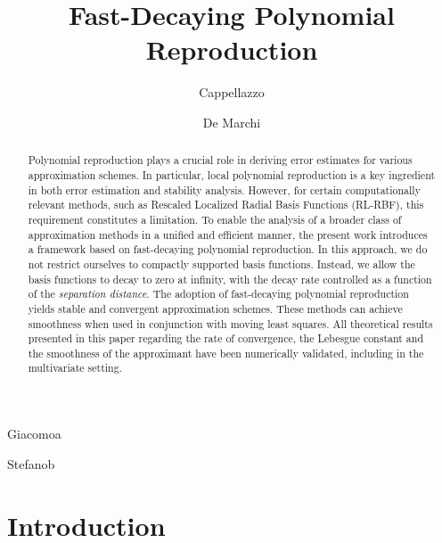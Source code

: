 \documentclass{drna}
\begin{document}
\title{Fast-Decaying Polynomial Reproduction}

\author{Cappellazzo}{Giacomo}{a}
\author{De Marchi}{Stefano}{b}




\maketitle


\begin{abstract}
Polynomial reproduction plays a crucial role in deriving error estimates for various approximation schemes. In particular, local polynomial reproduction is a key ingredient in both error estimation and stability analysis. However, for certain computationally relevant methods, such as Rescaled Localized Radial Basis Functions (RL-RBF), this requirement constitutes a limitation.
To enable the analysis of a broader class of approximation methods in a unified and efficient manner, the present work introduces a framework based on fast-decaying polynomial reproduction. In this approach, we do not restrict ourselves to compactly supported basis functions. Instead, we allow the basis functions to decay to zero at infinity, with the decay rate controlled as a function of the \textit{separation distance}. The adoption of fast-decaying polynomial reproduction yields stable and convergent approximation schemes. These methods can achieve smoothness when used in conjunction with moving least squares.
All theoretical results presented in this paper regarding the rate of convergence, the Lebesgue constant and the smoothness of the approximant have been numerically validated, including in the multivariate setting.
\end{abstract}


\section{Introduction}
\end{document}
